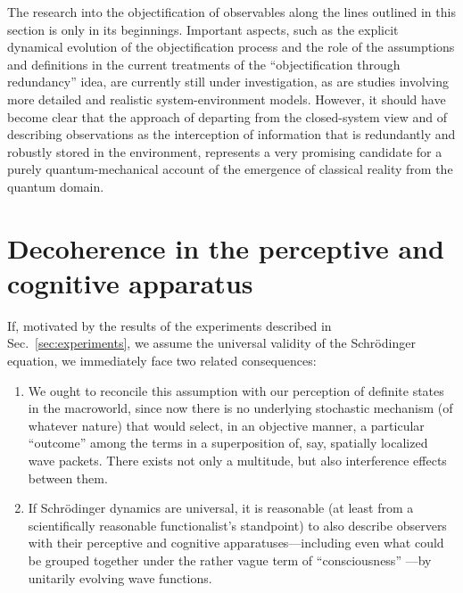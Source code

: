 \documentclass[12pt,aps,floatfix,amsmath,amssymb,showpacs,nofootinbib]{revtex4-2}
\newcommand{\bn}{\begin{enumerate}} \newcommand{\en}{\end{enumerate}}
\begin{document}
The research into the objectification of observables along the lines
outlined in this section is only in its beginnings. Important aspects,
such as the explicit dynamical evolution of the objectification
process \cite{Ollivier:2004:im} and the role of the assumptions and
definitions in the current treatments of the ``objectification through
redundancy'' idea, are currently still under investigation, as are
studies involving more detailed and realistic system-environment
models.  However, it should have become clear that the approach of
departing from the closed-system view and of describing observations
as the interception of information that is redundantly and robustly
stored in the environment, represents a very promising candidate for a
purely quantum-mechanical account of the emergence of classical
reality from the quantum domain.


\section{Decoherence in the perceptive and cognitive apparatus} \label{sec:brain}

If, motivated by the results of the experiments described in
Sec.~\ref{sec:experiments}, we assume the universal validity of the
Schr\"odinger equation, we immediately face two related consequences:

\bn

\item We ought to reconcile this assumption with our perception
  of definite states in the macroworld, since now there is no
  underlying stochastic mechanism (of whatever nature) that would
  select, in an objective manner, a particular ``outcome'' among the
  terms in a superposition of, say, spatially localized wave packets.
  There exists not only a multitude, but also interference effects
  between them.
  
\item If Schr\"odinger dynamics are universal, it is reasonable
  (at least from a scientifically reasonable functionalist's
  standpoint) to also describe observers with their perceptive and
  cognitive apparatuses---including even what could be grouped
  together under the rather vague term of ``consciousness''
  \cite{Neumann:1932:gq,Wigner:1962:iu,Stapp:1993:mm,Zeh:2000:rr}---by
  unitarily evolving wave functions.

\en
\end{document}
